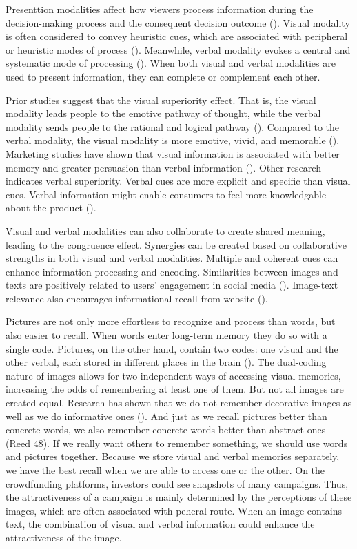 \documentclass[a4paper]{article}
\begin{document}
Presenttion modalities affect how viewers process information during the decision-making process and the consequent decision outcome (\cite{bettman_effects_1977}). Visual modality is often considered to convey heuristic cues, which are associated with peripheral or heuristic modes of process (\cite{jeong_visual_2008}). Meanwhile, verbal modality evokes a central and systematic mode of processing (\cite{kim_effects_2008}). When both visual and verbal modalities are used to present information, they can complete or complement each other. 

Prior studies suggest that the visual superiority effect. That is, the visual modality leads people to the emotive pathway of thought, while the verbal modality sends people to the rational and logical pathway (\cite{joffe_power_2008}). Compared to the verbal modality, the visual modality is more emotive, vivid, and memorable (\cite{joffe_power_2008}). Marketing studies have shown that visual information is associated with better memory and greater persuasion than verbal information (\cite{smith_effects_1991}). Other research indicates verbal superiority. Verbal cues are more explicit and specific than visual cues. Verbal information might enable consumers to feel more knowledgable about the product (\cite{kim_effects_2008}). 

Visual and verbal modalities can also collaborate to create shared meaning, leading to the congruence effect. Synergies can be created based on collaborative strengths in both visual and verbal modalities. Multiple and coherent cues can enhance information processing and encoding. Similarities between images and texts are positively related to users' engagement in social media (\cite{shin_enhancing_2020}). Image-text relevance also encourages informational recall from website (\cite{riaz_interplay_2018}).  

Pictures are not only more effortless to recognize and process than words, but also easier to recall. When words enter long-term memory they do so with a single code. Pictures, on the other hand, contain two codes: one visual and the other verbal, each stored in different places in the brain (\cite{paivio_mental_1990}). The dual-coding nature of images allows for two independent ways of accessing visual memories, increasing the odds of remembering at least one of them. But not all images are created equal. Research has shown that we do not remember decorative images as well as we do informative ones (\cite{harp_role_1997}). And just as we recall pictures better than concrete words, we also remember concrete words better than abstract ones (Reed 48). If we really want others to remember something, we should use words and pictures together. Because we store visual and verbal memories separately, we have the best recall when we are able to access one or the other. On the crowdfunding platforms, investors could see snapshots of many campaigns. Thus, the attractiveness of a campaign is mainly determined by the perceptions of these images, which are often associated with peheral route. When an image contains text, the combination of visual and verbal information could enhance the attractiveness of the image. 
\end{document}
